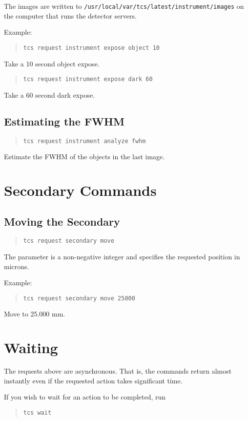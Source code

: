 The images are written to \verb|/usr/local/var/tcs/latest/instrument/images| on the computer that runs the detector servers.

Example:

\begin{quote}
\verb|tcs request instrument expose object 10|
\end{quote}
Take a 10 second object expose.
\begin{quote}
\verb|tcs request instrument expose dark 60|
\end{quote}
Take a 60 second dark expose.

\subsection{Estimating the FWHM}

\begin{quote}
\verb|tcs request instrument analyze fwhm|
\end{quote}
Estimate the FWHM of the objects in the last image.

\section{Secondary Commands}

\subsection{Moving the Secondary}

\begin{quote}
\verb|tcs request secondary move| 
\end{quote}
The  parameter is a non-negative integer and specifies the requested position in microns.

Example:

\begin{quote}
\verb|tcs request secondary move 25000|
\end{quote}
Move to 25.000 mm.

\section{Waiting}

The requests above are asynchronous. That is, the commands return almost instantly even if the requested action takes significant time.

If you wish to wait for an action to be completed, run
\begin{quote}
\verb|tcs wait| 
\end{quote}

